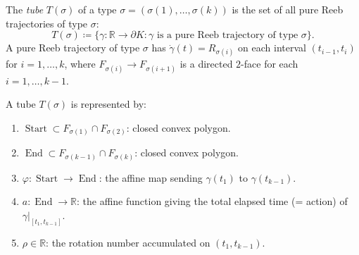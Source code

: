 \begin{unverified}
\begin{definition}[Tube]\label{def:tube}
The \emph{tube} $T(\sigma)$ of a type $\sigma = (\sigma(1), \ldots, \sigma(k))$
is the set of all pure Reeb trajectories of type $\sigma$:
\[
  T(\sigma) \coloneqq \bigl\{
    \gamma \colon \mathbb{R} \to \partial K
    : \gamma \text{ is a pure Reeb trajectory of type } \sigma
  \bigr\}.
\]
A pure Reeb trajectory of type $\sigma$ has
$\dot{\gamma}(t) = R_{\sigma(i)}$ on each interval
$(t_{i-1}, t_i)$ for $i = 1, \ldots, k$,
where $F_{\sigma(i)} \to F_{\sigma(i+1)}$ is a directed $2$-face
for each $i = 1, \ldots, k-1$.
\end{definition}
\end{unverified}


\begin{unverified}
\begin{definition}\label{def:tube-data}
A tube $T(\sigma)$ is represented by:
\begin{enumerate}
\item $\operatorname{Start} \subset F_{\sigma(1)} \cap F_{\sigma(2)}$:
  closed convex polygon.
\item $\operatorname{End} \subset F_{\sigma(k-1)} \cap F_{\sigma(k)}$:
  closed convex polygon.
\item $\varphi \colon \operatorname{Start} \to \operatorname{End}$:
  the affine map sending $\gamma(t_1)$ to $\gamma(t_{k-1})$.
\item $a \colon \operatorname{End} \to \mathbb{R}$:
  the affine function giving the total elapsed time (= action)
  of $\gamma|_{[t_1, t_{k-1}]}$.
\item $\rho \in \mathbb{R}$:
  the rotation number accumulated on $(t_1, t_{k-1})$.
\end{enumerate}
\end{definition}
\end{unverified}


